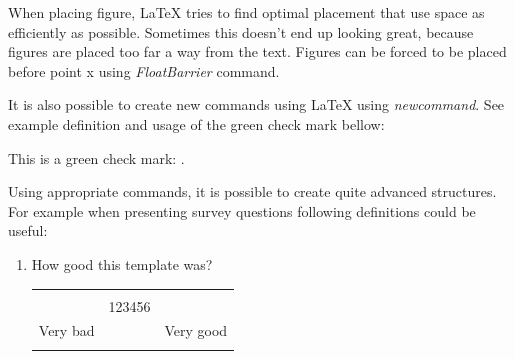 When placing figure, LaTeX tries to find optimal placement that use space as efficiently as possible. Sometimes this doesn't end up looking great, because figures are placed too far a way from the text. Figures can be forced to be placed before point x using \textit{FloatBarrier} command.

It is also possible to create new commands using LaTeX using \textit{newcommand}. See example definition and usage of the green check mark bellow:

\newcommand{\greencheckmark}{
	\color{green}\color{black}
}
This is a green check mark: \greencheckmark.

Using appropriate commands, it is possible to create quite advanced structures. For example when presenting survey questions following definitions could be useful:

\makeatletter
\newcommand{\radiobutton}{
	\begin{tikzpicture}
		\pgfmathsetlengthmacro\radius{height("X")/2}
		\draw[radius=\radius] circle;
	\end{tikzpicture}
}
\makeatother

\newcommand{\likertscaledescription}{
	1\hspace*{2em}2\hspace*{2em}3\hspace*{2em}4\hspace*{2em}5\hspace*{2em}6
}

\newcommand{\likertscalebuttons}{
	\hspace*{0.2em}\radiobutton\hspace*{1.318em}\radiobutton\hspace*{1.318em}\radiobutton\hspace*{1.318em}\radiobutton\hspace*{1.318em}\radiobutton\hspace*{1.318em}\radiobutton\hspace*{0.2em}
}

\newcommand{\likertscalesmall}[2]{
	\begin{center}
		\begin{tabular}{c c c}
			& & \\
			& \likertscaledescription & \\ 
			#1 & \likertscalebuttons & #2 \\
			& & \\
		\end{tabular}
	\end{center}
}

\vspace{2em}
\begin{enumerate}
    \item How good this template was?
    \likertscalesmall{Very bad}{Very good}
\end{enumerate}